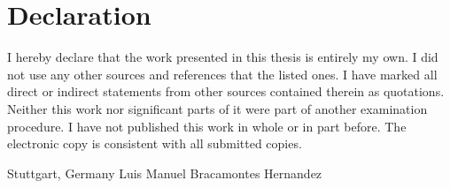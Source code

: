 \cleardoublepage
{}
\chapter*{Declaration}
%
%

I hereby declare that the work presented in this thesis is entirely my own.
I did not use any other sources and references that the listed ones. I have marked all direct or indirect
statements from other sources contained therein as quotations.
Neither this work nor significant parts of it were part of another examination procedure. I have not published
this work in whole or in part before.
The electronic copy is consistent with all submitted copies.

Stuttgart, Germany \hspace{5cm} Luis Manuel Bracamontes Hernandez

